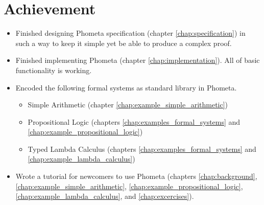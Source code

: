 \documentclass[master.tex]{subfiles}
\begin{document}
\section{Achievement}
\begin{itemize}
\item Finished designing Phometa specification (chapter
  \ref{chap:specification}) in such a way to keep it simple yet be able to
  produce a complex proof.
\item Finished implementing Phometa (chapter \ref{chap:implementation}). All of
  basic functionality is working.
\item Encoded the following formal systems as standard library in Phometa.
  \begin{itemize}
  \item Simple Arithmetic (chapter \ref{chap:example_simple_arithmetic})
  \item Propositional Logic (chapters \ref{chap:examples_formal_systems} and
    \ref{chap:example_propositional_logic})
  \item Typed Lambda Calculus (chapters
    \ref{chap:examples_formal_systems} and \ref{chap:example_lambda_calculus})
  \end{itemize}
\item Wrote a tutorial for newcomers to use Phometa (chapters
  \ref{chap:background}, \ref{chap:example_simple_arithmetic},
  \ref{chap:example_propositional_logic},
  \ref{chap:example_lambda_calculus}, and
  \ref{chap:excercises}).
\end{itemize}
\end{document}
